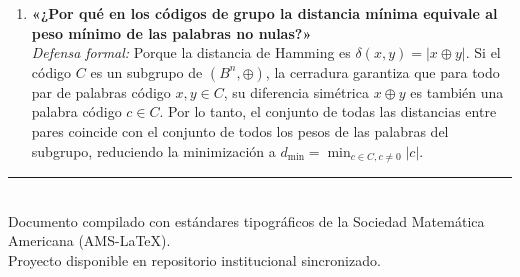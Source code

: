 \documentclass[11pt,a4paper]{article}
\begin{document}
\begin{enumerate}[leftmargin=*, label=\bfseries Pregunta \arabic*:]
  \item \textbf{«¿Por qué en los códigos de grupo la distancia mínima equivale al peso mínimo de las palabras no nulas?»}\\
  \textit{Defensa formal:} Porque la distancia de Hamming es $\delta(x, y) = |x \oplus y|$. Si el código $C$ es un subgrupo de $(B^n, \oplus)$, la cerradura garantiza que para todo par de palabras código $x, y \in C$, su diferencia simétrica $x \oplus y$ es también una palabra código $c \in C$. Por lo tanto, el conjunto de todas las distancias entre pares coincide con el conjunto de todos los pesos de las palabras del subgrupo, reduciendo la minimización a $d_{\min} = \min_{c \in C, c \neq 0} |c|$.
\end{enumerate}

\vspace{1cm}
\begin{center}
  \rule{0.6\linewidth}{0.5pt}\\[0.3cm]
  {\small\sffamily Documento compilado con estándares tipográficos de la Sociedad Matemática Americana (AMS-LaTeX).\\
  Proyecto disponible en repositorio institucional sincronizado.}
\end{center}
\end{document}
